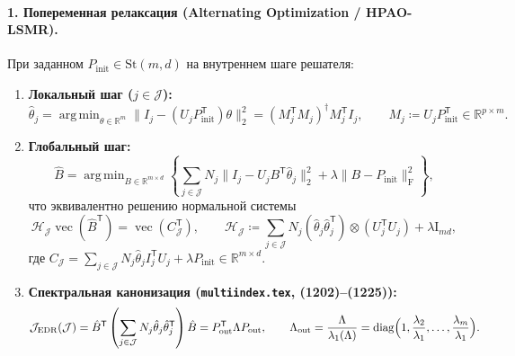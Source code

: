 \documentclass[11pt,a4paper]{article}
\newcommand{\R}{\mathbb{R}}
\newcommand{\Id}{\mathrm{I}}
\newcommand{\T}{^{\mathsf{T}}}
\newcommand{\F}{_{\mathrm{F}}}
\newcommand{\St}{\mathrm{St}}
\newcommand{\JEDR}{\mathcal{J}_{\mathrm{EDR}}}
\newcommand{\JJJ}{\mathcal{J}}
\DeclareMathOperator{\diag}{diag}
\DeclareMathOperator{\argmin}{arg\,min}
\theoremstyle{definition}
\theoremstyle{remark}
\begin{document}
\paragraph{1. Попеременная релаксация (Alternating Optimization / HPAO-LSMR).}
При заданном $P_{\mathrm{init}} \in \St(m,d)$ на внутреннем шаге решателя:
\begin{enumerate}
    \item \textbf{Локальный шаг ($j \in \JJJ$):}
    \begin{equation}\label{eq:ao_local}
        \hat{\theta}_j = \argmin_{\theta \in \R^m} \bigl\|I_j - (U_j P_{\mathrm{init}}\T)\theta\bigr\|_2^2 = (M_j\T M_j)^{\dagger} M_j\T I_j, \qquad M_j \coloneqq U_j P_{\mathrm{init}}\T \in \R^{p \times m}.
    \end{equation}
    \item \textbf{Глобальный шаг:}
    \begin{equation}\label{eq:ao_global}
        \hat{B} = \argmin_{B \in \R^{m \times d}} \left\{ \sum_{j \in \JJJ} N_j \bigl\|I_j - U_j B\T \hat{\theta}_j\bigr\|_2^2 + \lambda \|B - P_{\mathrm{init}}\|\F^2 \right\},
    \end{equation}
    что эквивалентно решению нормальной системы
    \begin{equation}\label{eq:normal_op}
        \mathcal{H}_{\JJJ} \operatorname{vec}(\hat{B}\T) = \operatorname{vec}(C_{\JJJ}\T), \qquad \mathcal{H}_{\JJJ} \coloneqq \sum_{j \in \JJJ} N_j (\hat{\theta}_j \hat{\theta}_j\T) \otimes (U_j\T U_j) + \lambda \Id_{md},
    \end{equation}
    где $C_{\JJJ} = \sum_{j \in \JJJ} N_j \hat{\theta}_j I_j\T U_j + \lambda P_{\mathrm{init}} \in \R^{m \times d}$.
    \item \textbf{Спектральная канонизация (\texttt{multiindex.tex}, (1202)--(1225)):}
    \begin{equation}\label{eq:J_edr_emp}
        \JEDR(\JJJ) = \hat{B}\T \left(\sum_{j \in \JJJ} N_j \hat{\theta}_j \hat{\theta}_j\T\right) \hat{B} = P_{\mathrm{out}}\T \Lambda P_{\mathrm{out}}, \qquad \Lambda_{\mathrm{out}} = \frac{\Lambda}{\lambda_1(\Lambda)} = \diag\Bigl(1, \frac{\lambda_2}{\lambda_1}, \ldots, \frac{\lambda_m}{\lambda_1}\Bigr).
    \end{equation}
\end{enumerate}
\end{document}
